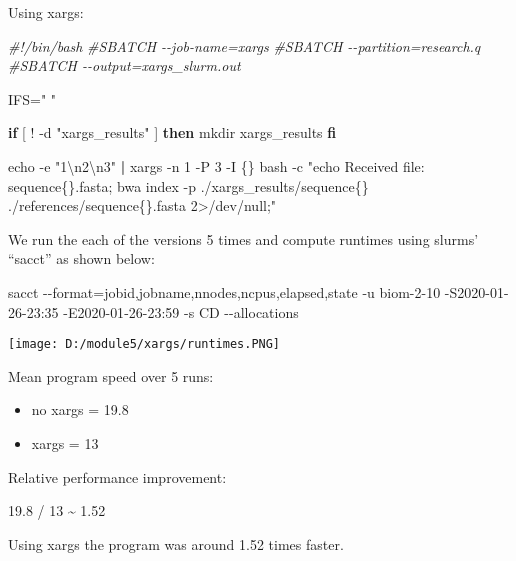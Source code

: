 \documentclass[]{article}
\newenvironment{Shaded}{\begin{snugshade}}{\end{snugshade}}
\newcommand{\BuiltInTok}[1]{#1}
\newcommand{\CommentTok}[1]{\textcolor[rgb]{0.56,0.35,0.01}{\textit{#1}}}
\newcommand{\ExtensionTok}[1]{#1}
\newcommand{\FunctionTok}[1]{\textcolor[rgb]{0.00,0.00,0.00}{#1}}
\newcommand{\KeywordTok}[1]{\textcolor[rgb]{0.13,0.29,0.53}{\textbf{#1}}}
\newcommand{\NormalTok}[1]{#1}
\newcommand{\OtherTok}[1]{\textcolor[rgb]{0.56,0.35,0.01}{#1}}
\newcommand{\StringTok}[1]{\textcolor[rgb]{0.31,0.60,0.02}{#1}}
\newcommand{\VariableTok}[1]{\textcolor[rgb]{0.00,0.00,0.00}{#1}}
\begin{document}
Using xargs:

\begin{Shaded}
\begin{Highlighting}[]
\CommentTok{\#!/bin/bash}
\CommentTok{\#SBATCH {-}{-}job{-}name=xargs}
\CommentTok{\#SBATCH {-}{-}partition=research.q}
\CommentTok{\#SBATCH {-}{-}output=xargs\_slurm.out}

\VariableTok{IFS=}\StringTok{" "}

\KeywordTok{if}\BuiltInTok{ [} \OtherTok{!} \OtherTok{{-}d} \StringTok{"xargs\_results"}\BuiltInTok{ ]}
\KeywordTok{then}
    \FunctionTok{mkdir}\NormalTok{ xargs\_results}
\KeywordTok{fi}

\BuiltInTok{echo}\NormalTok{ {-}e }\StringTok{"1\textbackslash{}n2\textbackslash{}n3"} \KeywordTok{|} \FunctionTok{xargs}\NormalTok{ {-}n 1 {-}P 3 {-}I \{\} }\FunctionTok{bash}\NormalTok{ {-}c }\StringTok{"echo \textquotesingle{}Received file: sequence\{\}.fasta\textquotesingle{}; bwa index {-}p ./xargs\_results/sequence\{\} ./references/sequence\{\}.fasta 2>/dev/null;"}
\end{Highlighting}
\end{Shaded}

We run the each of the versions 5 times and compute runtimes using
slurms' ``sacct'' as shown below:

\begin{Shaded}
\begin{Highlighting}[]
\ExtensionTok{sacct}\NormalTok{ {-}{-}format=jobid,jobname,nnodes,ncpus,elapsed,state {-}u biom{-}2{-}10 {-}S2020{-}01{-}26{-}23:35 {-}E2020{-}01{-}26{-}23:59 {-}s CD {-}{-}allocations }
\end{Highlighting}
\end{Shaded}

\texttt{[image: D:/module5/xargs/runtimes.PNG]}

Mean program speed over 5 runs:

\begin{itemize}
\item
  no xargs = 19.8
\item
  xargs = 13
\end{itemize}

Relative performance improvement:

19.8 / 13 \textasciitilde{} 1.52

Using xargs the program was around 1.52 times faster.
\end{document}
